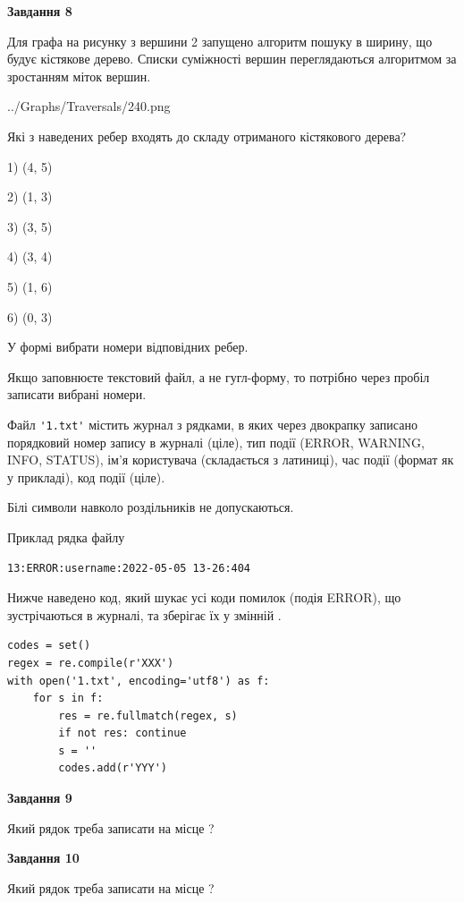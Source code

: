 \documentclass[12pt, ukrainian]{article}
\def\code#1{\Verb!#1!}
\begin{document}
{\begin {large}
{\begin {center}\textbf{Завдання 8}\end {center}}\par
Для графа на рисунку з вершини 2 запущено алгоритм пошуку в ширину, що будує кістякове дерево. Списки суміжності вершин переглядаються алгоритмом за зростанням міток вершин.\par
\begin{center}
	{../Graphs/Traversals/240.png}
\end{center}
\par Які з наведених ребер входять до складу отриманого кістякового дерева?\par
1) (4, 5)\par
2) (1, 3)\par
3) (3, 5)\par
4) (3, 4)\par
5) (1, 6)\par
6) (0, 3)\par
{\vskip 15pt} У формі вибрати номери відповідних ребер.


Якщо заповнюєте текстовий файл, а не гугл-форму, то потрібно через пробіл записа\-ти вибрані номери.\par
\newpage


Файл \code{'1.txt'} містить журнал з рядками, в яких через двокрапку записано поряд\-ко\-вий номер запису в журналі (ціле), тип події (ERROR, WARNING, INFO, STATUS), ім'я користувача (складається з латиниці), час події (фор\-мат як у прикладі), код події (ціле).

Білі символи навколо роздільників не допускаються.

Приклад рядка файлу



\begin{verbatim}
13:ERROR:username:2022-05-05 13-26:404
\end{verbatim}


Нижче наведено код, який шукає усі коди помилок (подія ERROR), що зустріча\-ють\-ся в журналі, та зберігає їх у змінній .



\begin{verbatim}
codes = set()
regex = re.compile(r'XXX')
with open('1.txt', encoding='utf8') as f:
    for s in f:
        res = re.fullmatch(regex, s)
        if not res: continue
        s = ''
        codes.add(r'YYY')
\end{verbatim}


{\begin {center}\textbf{Завдання 9}\end {center}}\par
Який рядок треба записати на місце  ?\par
\vspace{5mm}


{\begin {center}\textbf{Завдання 10}\end {center}}\par
Який рядок треба записати на місце  ?\par


\newpage


\end {large}}
\end{document}
